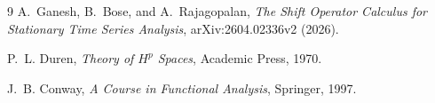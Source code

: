 \documentclass[11pt]{article}
\theoremstyle{remark}
\begin{document}
\begin{thebibliography}{9}
A.~Ganesh, B.~Bose, and A.~Rajagopalan,
\emph{The Shift Operator Calculus for Stationary Time Series Analysis},
arXiv:2604.02336v2 (2026).

P.~L. Duren, \emph{Theory of \(H^p\) Spaces}, Academic Press, 1970.

J.~B. Conway, \emph{A Course in Functional Analysis}, Springer, 1997.
\end{thebibliography}
\end{document}
